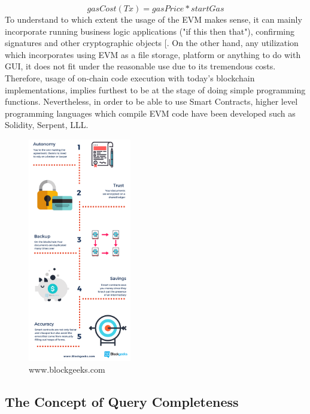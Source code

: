 				\[ gasCost(Tx)= {gasPrice *  startGas}\]
To understand to which extent the usage of the EVM makes sense, it can mainly incorporate running business logic applications ("if this then that"), confirming signatures and other cryptographic objects [\cite{Ethereum2017}. On the other hand, any utilization which incorporates using EVM as a file storage, platform or anything to do with GUI, it does not fit under the reasonable use due to its tremendous costs. Therefore, usage of on-chain code execution with today's blockchain implementations, implies furthest to be at the stage of doing simple programming functions. Nevertheless, in order to be able to use Smart Contracts, higher level programming languages which compile EVM code have been developed such as Solidity, Serpent, LLL.



\begin{figure}[h]
\centering
\includegraphics[width=0.4\textwidth]{images/smartcontracts.png}
\caption{\label{fig:Smartcontracts}www.blockgeeks.com}
\end{figure}



\subsection{The Concept of Query Completeness} \label{sssec:querycompleteness}


